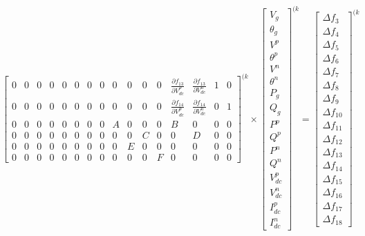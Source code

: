 \documentclass[11pt,fleqn]{book} %
\begin{document}
\begin{equation}
\begin{bmatrix}
0 & 0 & 0 & 0 & 0 & 0 & 0 & 0 & 0 & 0 & 0 & 0 & \frac{\partial f_{13}}{\partial V_{dc}^p} & \frac{\partial f_{13}}{\partial V_{dc}^n} & 1 & 0\\ 

0 & 0 & 0 & 0 & 0 & 0 & 0 & 0 & 0 & 0 & 0 & 0 & \frac{\partial f_{14}}{\partial V_{dc}^p} & \frac{\partial f_{14}}{\partial V_{dc}^n} & 0 & 1\\ 

0 & 0 & 0 & 0 & 0 & 0 & 0 & 0 & A & 0 & 0 & 0 & B & 0 & 0 & 0\\ 

0 & 0 & 0 & 0 & 0 & 0 & 0 & 0 & 0 & 0 & C & 0 & 0 & D & 0 & 0\\ 

0 & 0 & 0 & 0 & 0 & 0 & 0 & 0 & 0 & E & 0 & 0 & 0 & 0 & 0 & 0\\ 

0 & 0 & 0 & 0 & 0 & 0 & 0 & 0 & 0 & 0 & 0 & F & 0 & 0 & 0 & 0
\end{bmatrix}^{(k}
\times
\begin{bmatrix}
V_g\\ 
\theta_g\\ 
V^p\\ 
\theta^p\\ 
V^n\\ 
\theta^n\\ 
P_g\\ 
Q_g\\ 
P^p\\ 
Q^p\\ 
P^n\\ 
Q^n\\ 
V_{dc}^p\\ 
V_{dc}^n\\ 
I_{dc}^p\\ 
I_{dc}^n
\end{bmatrix}^{(k}
=
\begin{bmatrix}
\Delta f_3\\ 
\Delta f_4\\ 
\Delta f_5\\ 
\Delta f_6\\ 
\Delta f_7\\ 
\Delta f_8\\ 
\Delta f_9\\ 
\Delta f_{10}\\ 
\Delta f_{11}\\ 
\Delta f_{12}\\ 
\Delta f_{13}\\ 
\Delta f_{14}\\ 
\Delta f_{15}\\ 
\Delta f_{16}\\ 
\Delta f_{17}\\ 
\Delta f_{18}
\end{bmatrix}^{(k}
\end{equation}
\end{document}
